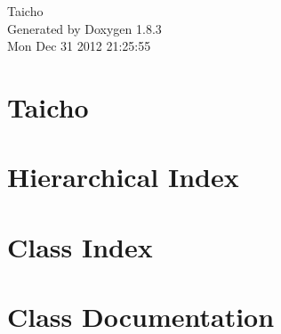 \documentclass{book}
\begin{document}
\hypersetup{pageanchor=false,citecolor=blue}
\begin{titlepage}
\vspace*{7cm}
\begin{center}
{\Large Taicho }\\
\vspace*{1cm}
{\large Generated by Doxygen 1.8.3}\\
\vspace*{0.5cm}
{\small Mon Dec 31 2012 21:25:55}\\
\end{center}
\end{titlepage}
\clearemptydoublepage
{}
\tableofcontents
\clearemptydoublepage
{}
\hypersetup{pageanchor=true,citecolor=blue}
\chapter{Taicho}
\label{md_README}
\hypertarget{md_README}{}

\chapter{Hierarchical Index}

\chapter{Class Index}

\chapter{Class Documentation}


























\printindex
\end{document}
